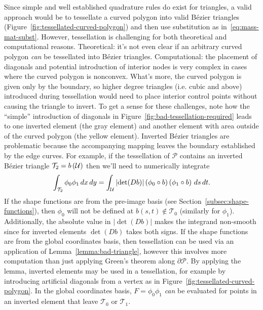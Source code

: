 Since simple and well established quadrature rules do exist for triangles,
a valid approach would be
to tessellate a curved polygon into valid B\'{e}zier triangles
(Figure~\ref{fig:tessellated-curved-polygon}) and then use substitution as
in~\eqref{eq:mass-mat-subst}. However, tessellation is challenging for both
theoretical and computational reasons.
Theoretical: it's not even clear if an arbitrary curved polygon \emph{can}
be tessellated into B\'{e}zier triangles. Computational: the placement
of diagonals and potential introduction of interior nodes is very
complex in cases where the curved polygon is nonconvex. What's more,
the curved polygon is given only by the boundary, so higher degree triangles
(i.e. cubic and above) introduced during tessellation would need to place
interior control points without causing the triangle to invert. To get a
sense for these challenges, note how the ``simple'' introduction of
diagonals in Figure~\ref{fig:bad-tessellation-required} leads to one
inverted element (the gray element) and another element with area outside
of the curved polygon (the yellow element). Inverted B\'{e}zier triangles
are problematic because the accompanying mapping leaves the boundary
established by the edge curves. For example,
if the tessellation of \(\mathcal{P}\) contains an inverted
B\'{e}zier triangle \(\mathcal{T}_2 = b\left(\mathcal{U}\right)\) then we'll
need to numerically integrate
\begin{equation}
\int_{\mathcal{T}_2} \phi_0 \phi_1 \, dx \, dy =
  \int_{\mathcal{U}} \left|\det(Db)\right| \left(\phi_0 \circ b\right)
  \left(\phi_1 \circ b\right) \, ds \, dt.
\end{equation}
If the shape functions are from the pre-image basis (see
Section~\ref{subsec:shape-functions}), then \(\phi_0\)
will not be defined at \(b(s, t) \not\in \mathcal{T}_0\) (similarly for
\(\phi_1\)). Additionally, the absolute value in \(\left|\det(Db)\right|\)
makes the integrand non-smooth since for inverted elements
\(\det(Db)\) takes both signs. If the shape functions are from the
global coordinates basis, then tessellation can be used via an
application of Lemma~\ref{lemma:bad-triangle}, however this involves
more computation than just applying Green's theorem along
\(\partial \mathcal{P}\). By applying the lemma, inverted elements may
be used in a tessellation, for example by introducing artificial
diagonals from a vertex as in Figure~\ref{fig:tessellated-curved-polygon}.
In the global coordinates basis, \(F = \phi_0 \phi_1\) \textit{can}
be evaluated for points in an inverted element that leave
\(\mathcal{T}_0\) or \(\mathcal{T}_1\).

